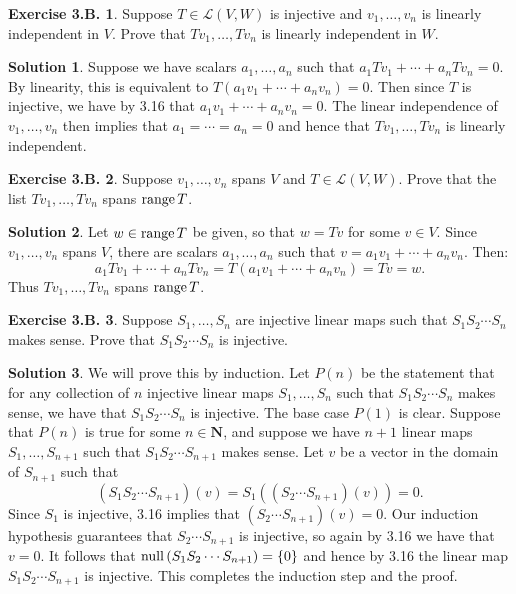 \documentclass[12pt]{article}
\theoremstyle{definition}
\theoremstyle{exercise}
\newtheorem{exercise}{Exercise 3.B.}
\theoremstyle{solution}
\newtheorem*{solution}{Solution}
\newcommand{\lmap}{\mathcal{L}}
\newcommand{\Null}{\text{null\,}}
\newcommand{\Range}{\text{range\,}}
\newcommand{\N}{\mathbf{N}}
\begin{document}
\begin{exercise}
\label{ex:9}
    Suppose \( T \in \lmap(V, W) \) is injective and \( v_1, \ldots, v_n \) is linearly independent in \( V \). Prove that \( Tv_1, \ldots, Tv_n \) is linearly independent in \( W \).
\end{exercise}

\begin{solution}
    Suppose we have scalars \( a_1, \ldots, a_n \) such that \( a_1 Tv_1 + \cdots + a_n Tv_n = 0 \). By linearity, this is equivalent to \( T(a_1 v_1 + \cdots + a_n v_n) = 0 \). Then since \( T \) is injective, we have by 3.16 that \( a_1 v_1 + \cdots + a_n v_n = 0 \). The linear independence of \( v_1, \ldots, v_n \) then implies that \( a_1 = \cdots = a_n = 0 \) and hence that \( Tv_1, \ldots, Tv_n \) is linearly independent.
\end{solution}

\begin{exercise}
\label{ex:10}
    Suppose \( v_1, \ldots, v_n \) spans \( V \) and \( T \in \lmap(V, W) \). Prove that the list \( Tv_1, \ldots, Tv_n \) spans \( \Range T \).
\end{exercise}

\begin{solution}
    Let \( w \in \Range T \) be given, so that \( w = Tv \) for some \( v \in V \). Since \( v_1, \ldots, v_n \) spans \( V \), there are scalars \( a_1, \ldots, a_n \) such that \( v = a_1 v_1 + \cdots + a_n v_n \). Then:
    \[
        a_1 Tv_1 + \cdots + a_n Tv_n = T(a_1 v_1 + \cdots + a_n v_n) = Tv = w.
    \]
    Thus \( Tv_1, \ldots, Tv_n \) spans \( \Range T \).
\end{solution}

\begin{exercise}
\label{ex:11}
    Suppose \( S_1, \ldots, S_n \) are injective linear maps such that \( S_1 S_2 \cdots S_n \) makes sense. Prove that \( S_1 S_2 \cdots S_n \) is injective.
\end{exercise}

\begin{solution}
    We will prove this by induction. Let \( P(n) \) be the statement that for any collection of \( n \) injective linear maps \( S_1, \ldots, S_n \) such that \( S_1 S_2 \cdots S_n \) makes sense, we have that \( S_1 S_2 \cdots S_n \) is injective. The base case \( P(1) \) is clear. Suppose that \( P(n) \) is true for some \( n \in \N \), and suppose we have \( n + 1 \) linear maps \( S_1, \ldots, S_{n+1} \) such that \( S_1 S_2 \cdots S_{n+1} \) makes sense. Let \( v \) be a vector in the domain of \( S_{n+1} \) such that
    \[
        (S_1 S_2 \cdots S_{n+1})(v) = S_1((S_2 \cdots S_{n+1})(v)) = 0.
    \]
    Since \( S_1 \) is injective, 3.16 implies that \( (S_2 \cdots S_{n+1})(v) = 0 \). Our induction hypothesis guarantees that \( S_2 \cdots S_{n+1} \) is injective, so again by 3.16 we have that \( v = 0 \). It follows that \( \Null (S_1 S_2 \cdots S_{n+1}) = \{ 0 \} \) and hence by 3.16 the linear map \( S_1 S_2 \cdots S_{n+1} \) is injective. This completes the induction step and the proof.
\end{solution}
\end{document}
